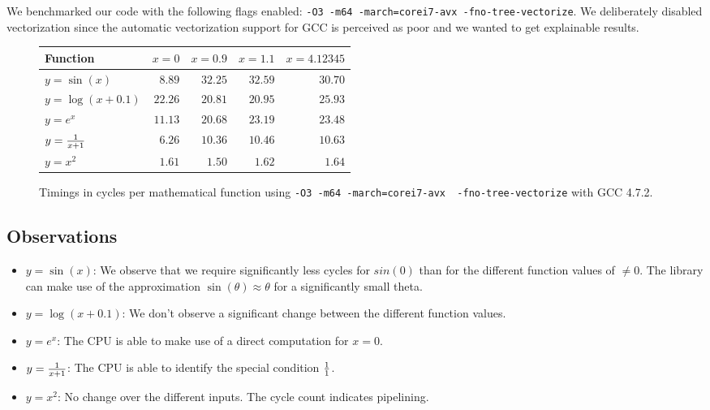 \documentclass[portrait,a4paper]{article}
\begin{document}
We benchmarked our code with the following flags enabled: \lstinline{-O3 -m64 -march=corei7-avx -fno-tree-vectorize}. We deliberately disabled vectorization since the automatic vectorization support for GCC is perceived as poor and we wanted to get explainable results.
\begin{figure}[H]
    \centering
    \begin{tabular}{l|r|r|r|r}
        \textbf{Function} & $x=0$ & $x=0.9$ & $x=1.1$ & $x=4.12345$ \\ \hline
        $y=\sin(x)$     & $8.89$ & $32.25$& $32.59$& $30.70$ \\
        $y=\log(x+0.1)$ & $22.26$ & $20.81$ & $20.95$ & $25.93$\\
        $y=e^x$         & $11.13$ & $20.68$ & $23.19$ & $23.48$\\
        $y={1\over x+1}$& $6.26$ & $10.36$ & $10.46$ & $10.63$\\
        $y=x^2$         & $1.61$  & $1.50$  & $1.62$  & $1.64$
    \end{tabular}
    \caption{Timings in cycles per mathematical function using \lstinline{-O3 -m64 -march=corei7-avx  -fno-tree-vectorize} with GCC 4.7.2.}
\end{figure}

\subsection{Observations}
\begin{itemize}
    \item $y=\sin(x)$: We observe that we require significantly less cycles for $sin(0)$ than for the different function values of $\neq 0$. The library can make use of the approximation $\sin(\theta)\approx \theta$ for a significantly small theta. 
    \item $y=\log(x+0.1)$: We don't observe a significant change between the different function values. 
    \item $y=e^x$: The CPU is able to make use of a direct computation for $x=0$. 
    \item $y={1\over x+1}$: The CPU is able to identify the special condition ${1\over 1}$.
    \item $y=x^2$: No change over the different inputs. The cycle count indicates pipelining.
\end{itemize}
\end{document}
